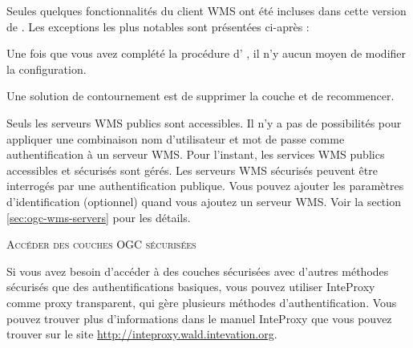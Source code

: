 Seules quelques fonctionnalités du client WMS ont été incluses dans cette version de \qg. Les exceptions les plus notables sont présentées ci-après :


Une fois que vous avez complété la procédure d' , il n'y aucun moyen de modifier la configuration.

Une solution de contournement est de supprimer la couche et de recommencer.


Seuls les serveurs WMS publics sont accessibles. Il n'y a pas de possibilités pour appliquer une combinaison nom d'utilisateur et mot de passe comme authentification à un serveur WMS. Pour l'instant, les services WMS publics accessibles et sécurisés sont gérés. Les serveurs WMS sécurisés peuvent être interrogés par une authentification publique. Vous pouvez  ajouter les paramètres d'identification (optionnel) quand vous ajoutez un serveur WMS. Voir la section  \ref{sec:ogc-wms-servers} pour les détails.


\begin{Tip}[ht]\caption{\textsc{Accéder des couches OGC sécurisées}}
Si vous avez besoin d'accéder à des couches sécurisées avec d'autres méthodes sécurisés que des authentifications basiques, vous pouvez utiliser InteProxy comme proxy transparent, qui gère plusieurs méthodes d'authentification. Vous pouvez trouver plus d'informations dans le manuel InteProxy que vous pouvez trouver sur le site \url{http://inteproxy.wald.intevation.org}. 
\end{Tip}


